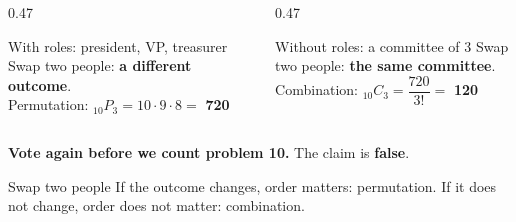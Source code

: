 \documentclass[aspectratio=169, 11pt]{beamer}
\newcommand{\redink}[1]{{\color{redacc}\bfseries #1}}
\newcommand{\Pnr}[2]{{}_{#1}P_{#2}}
\newcommand{\Cnr}[2]{{}_{#1}C_{#2}}
\begin{document}
\begin{frame}[t, plain]
  \begin{columns}[t]
    \begin{column}{0.47\textwidth}
      \begin{block}{With roles: president, VP, treasurer}
        Swap two people: \textbf{a different outcome}.\\[4pt]
        Permutation: $\Pnr{10}{3} = 10 \cdot 9 \cdot 8 =$ \redink{720}
      \end{block}
    \end{column}
    \begin{column}{0.47\textwidth}
      \begin{block}{Without roles: a committee of 3}
        Swap two people: \textbf{the same committee}.\\[4pt]
        Combination: $\Cnr{10}{3} = \dfrac{720}{3!} =$ \redink{120}
      \end{block}
    \end{column}
  \end{columns}
  \vspace{6pt}
  \begin{center}
    \textbf{Vote again before we count problem 10.} The claim is \redink{false}.
  \end{center}
  \begin{block}{Swap two people}
    If the outcome changes, order matters: permutation. If it does not change, order does not
    matter: combination.
  \end{block}
\end{frame}
\end{document}
